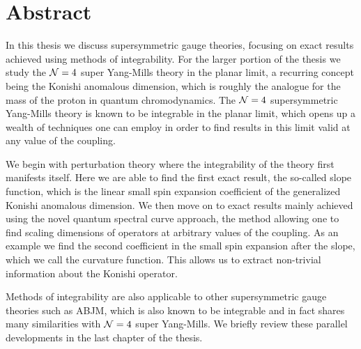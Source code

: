 
\section*{Abstract}

\vspace{30pt}




In this thesis we discuss supersymmetric gauge theories, focusing on exact results achieved using methods of integrability. 
For the larger portion of the thesis we study the $\mathcal{N}=4$ super Yang-Mills theory in the planar limit, a recurring concept being the Konishi anomalous dimension, which is roughly the analogue for the mass of the proton in quantum chromodynamics.
The $\mathcal{N}=4$ supersymmetric Yang-Mills theory is known to be integrable in the planar limit, which opens up a wealth of techniques one can employ in order to find results in this limit valid at any value of the coupling. 

We begin with perturbation theory where the integrability of the theory first manifests itself.
Here we are able to find the first exact result, the so-called slope function, which is the linear small spin expansion coefficient of the generalized Konishi anomalous dimension.
We then move on to exact results mainly achieved using the novel quantum spectral curve approach, the method allowing one to find scaling dimensions of operators at arbitrary values of the coupling.
As an example we find the second coefficient in the small spin expansion after the slope, which we call the curvature function.
This allows us to extract non-trivial information about the Konishi operator.

Methods of integrability are also applicable to other supersymmetric gauge theories such as ABJM, which is also known to be integrable and in fact shares many similarities with $\mathcal{N}=4$ super Yang-Mills. We briefly review these parallel developments in the last chapter of the thesis.
